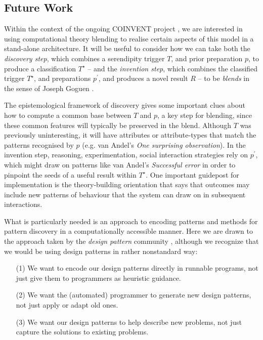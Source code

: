\subsection{Future Work} \label{sec:futurework} \label{sec:hatching}

Within the context of the ongoing COINVENT project \cite{coinvent14},
we are interested in using computational theory blending to realise
certain aspects of this model in a stand-alone architecture.
%
It will be useful to consider how we can take both the \emph{discovery
  step}, which combines a serendipity trigger $T$, and prior
preparation $p$, to produce a classification $T^{\star}$ -- and the
\emph{invention step}, which combines the classified trigger
$T^{\star}$, and preparations $p^{\prime}$, and produces a novel
result $R$ -- to be \emph{blends} in the sense of Joseph Goguen
\citeyear{goguen1999introduction}.

The epistemological framework of discovery gives some important clues
about how to compute a common base between $T$ and $p$, a key step for
blending, since these common features will typically be preserved in
the blend.  Although $T$ was previously uninteresting, it will have
attributes or attribute-types that match the patterns recognised by
$p$ (e.g. van Andel's \citeyear{van1994anatomy} \emph{One surprising
  observation}).
%
In the invention step, reasoning, experimentation, social interaction
strategies rely on $p^{\prime}$, which might draw on patterns like van
Andel's \emph{Successful error} in order to pinpoint the seeds of a useful result
within $T^{\star}$.  One important guidepost for implementation is
the theory-building orientation that says that outcomes may include
new patterns of behaviour that the system can draw on in subsequent interactions.

What is particularly needed is an approach to encoding patterns and
methods for pattern discovery in a computationally accessible manner.
Here we are drawn to the approach taken by the \emph{design pattern}
community \cite{alexander1999origins}, although we recognize that we
would be using design patterns in rather nonstandard way:
\begin{itemize}
\item[(1)] We want to encode our design patterns directly in runnable
  programs, not just give them to programmers as heuristic guidance.
\item[(2)] We want the (automated) programmer to generate new design
  patterns, not just apply or adapt old ones.
\item[(3)] We want our design patterns to help describe new problems,
  not just capture the solutions to existing problems.
\end{itemize}

